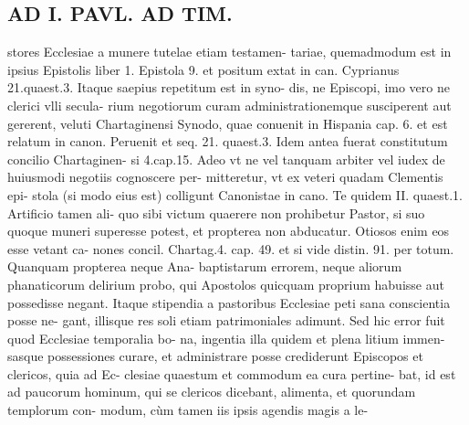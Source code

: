 \documentclass{article}
\begin{document}
\begin{pages}
\section*{AD I. PAVL. AD TIM. }
\marginpar{[ p.1 Q ]}\pstart stores Ecclesiae a munere tutelae etiam testamen- tariae, quemadmodum est in ipsius Epistolis liber  1. Epistola 9. et positum extat in can. Cyprianus 21.quaest.3. Itaque saepius repetitum est in syno- dis, ne Episcopi, imo vero ne clerici vlli secula- rium negotiorum curam administrationemque susciperent aut gererent, veluti Chartaginensi Synodo, quae conuenit in Hispania cap. 6. et est relatum in canon. Peruenit et seq. 21. quaest.3. Idem antea fuerat constitutum concilio Chartaginen- si 4.cap.15. Adeo vt ne vel tanquam arbiter vel iudex de huiusmodi negotiis cognoscere per- mitteretur, vt ex veteri quadam Clementis epi- stola (si modo eius est) colligunt Canonistae in cano. Te quidem II. quaest.1. Artificio tamen ali- quo sibi victum quaerere non prohibetur Pastor, si suo quoque  muneri superesse potest, et propterea non abducatur. Otiosos enim eos esse vetant ca- nones concil. Chartag.4. cap. 49. et si vide distin. 91. per totum. Quanquam propterea neque Ana- baptistarum errorem, neque aliorum phanaticorum delirium probo, qui Apostolos quicquam proprium habuisse aut possedisse negant. Itaque stipendia a pastoribus Ecclesiae peti sana conscientia posse ne- gant, illisque res soli etiam patrimoniales adimunt. Sed hic error fuit quod Ecclesiae temporalia bo- na, ingentia illa quidem et plena litium immen- sasque possessiones curare, et administrare posse crediderunt Episcopos et clericos, quia ad Ec- clesiae quaestum et commodum ea cura pertine- bat, id est ad paucorum hominum, qui se clericos dicebant, alimenta, et quorundam templorum con- modum, cùm tamen iis ipsis agendis magis a le-  \pend

\end{pages}
\end{document}
